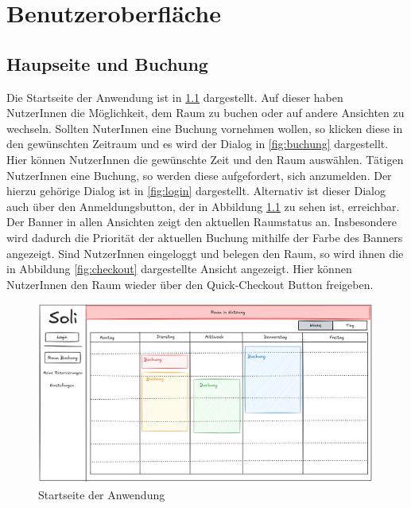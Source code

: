 
\chapter{Benutzeroberfläche}
\label{chap:ui}

\section{Haupseite und Buchung}

Die Startseite der Anwendung ist in \ref{fig:startseite} dargestellt.
Auf dieser haben NutzerInnen die Möglichkeit, dem Raum zu buchen oder auf andere Ansichten zu wechseln.
Sollten NuterInnen eine Buchung vornehmen wollen, so klicken diese in den gewünschten Zeitraum
und es wird der Dialog in \ref{fig:buchung} dargestellt.
Hier können NutzerInnen die gewünschte Zeit und den Raum auswählen.
Tätigen NutzerInnen eine Buchung, so werden diese aufgefordert, sich anzumelden.
Der hierzu gehörige Dialog ist in \ref{fig:login} dargestellt.
Alternativ ist dieser Dialog auch über den Anmeldungsbutton, der in Abbildung \ref{fig:startseite} zu sehen ist, erreichbar.
Der Banner in allen Ansichten zeigt den aktuellen Raumstatus an.
Insbesondere wird dadurch die Priorität der aktuellen Buchung mithilfe der Farbe des Banners angezeigt.
Sind NutzerInnen eingeloggt und belegen den Raum,
so wird ihnen die in Abbildung \ref{fig:checkout} dargestellte Ansicht angezeigt.
Hier können NutzerInnen den Raum wieder über den Quick-Checkout Button freigeben.

\begin{figure}[ht]
    \centering
    \includegraphics[scale=0.15]{figures/ui/startseite.png}
    \caption{Startseite der Anwendung}
    \label{fig:startseite}
\end{figure}

